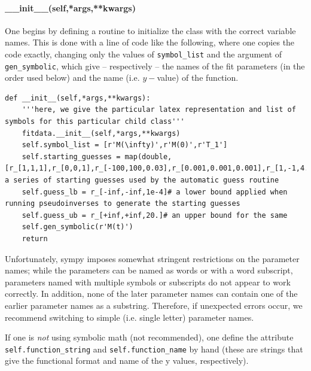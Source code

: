 \paragraph{\_\_init\_\_(self,*args,**kwargs)}
One begins by defining a routine to initialize the class with the correct variable names.
This is done with a line of code like the following,
    where one copies the code exactly, changing only the
    values of {\tt symbol\_list} and 
    the argument of {\tt gen\_symbolic},
    which give -- respectively -- the names of the fit parameters
    (in the order used below)
    and the name (i.e. $y-$value) of the function.
\begin{lstlisting}
def __init__(self,*args,**kwargs):
    '''here, we give the particular latex representation and list of symbols for this particular child class'''
    fitdata.__init__(self,*args,**kwargs)
    self.symbol_list = [r'M(\infty)',r'M(0)',r'T_1']
    self.starting_guesses = map(double,[r_[1,1,1],r_[0,0,1],r_[-100,100,0.03],r_[0.001,0.001,0.001],r_[1,-1,4.0]])# a series of starting guesses used by the automatic guess routine
    self.guess_lb = r_[-inf,-inf,1e-4]# a lower bound applied when running pseudoinverses to generate the starting guesses
    self.guess_ub = r_[+inf,+inf,20.]# an upper bound for the same
    self.gen_symbolic(r'M(t)')
    return
\end{lstlisting}
Unfortunately, sympy imposes somewhat stringent
    restrictions on the parameter names;
    while the parameters can be named as words
    or with a word subscript, parameters
    named with multiple symbols or subscripts do
    not appear to work correctly.
In addition, none of the later parameter names
    can contain one of the earlier parameter names
    as a substring.
Therefore, if unexpected errors occur, we recommend switching
    to simple (i.e. single letter) parameter names.

If one is {\it not} using symbolic math (not recommended),
    one define the attribute {\tt self.function\_string} and {\tt self.function\_name}
    by hand (these are strings that give the functional format and name of the y values,
    respectively).

